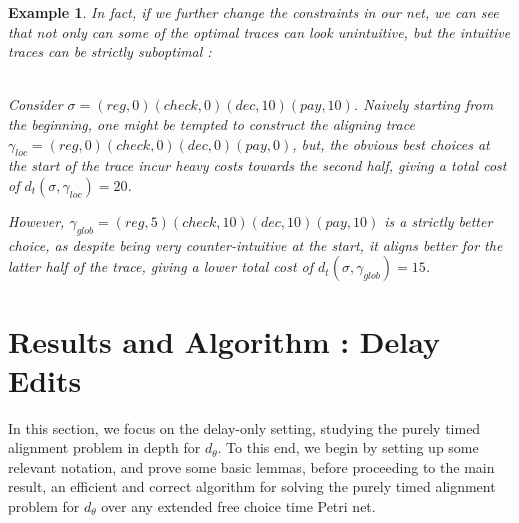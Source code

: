 \documentclass[conference]{IEEEtran}
\newtheorem{example}{Example}
\begin{document}
		\begin{example}\label{dthard}
		In fact, if we further change the constraints in our  net, we can see that not only can some of the optimal traces can look unintuitive, but the intuitive traces can be strictly suboptimal : 

			\\
			
			Consider $\sigma = (reg, 0)(check, 0)(dec, 10)(pay,10)$.
			Naively starting from the beginning, one might be tempted to construct the aligning trace $\gamma_{loc} = (reg, 0) (check, 0)(dec, 0)(pay, 0)$, but, the obvious best choices at the start of the trace incur heavy costs towards the second half, giving a total cost of $d_t(\sigma, \gamma_{loc}) = 20$. 
			
			However, $\gamma_{glob} = (reg, 5) (check, 10)(dec, 10)(pay, 10)$ is a strictly better choice, as despite being very counter-intuitive at the start, it aligns better for the latter half of the trace, giving a lower total cost of $d_t(\sigma, \gamma_{glob}) = 15$. 
			

		\end{example}
		


		\section{Results and Algorithm : Delay Edits}\label{4}
		In this section, we focus on the delay-only setting, studying the purely timed alignment problem in depth for $d_{\theta}$. 
		To this end, we begin by setting up some relevant notation, and prove some basic lemmas, before proceeding to the main result, an efficient and correct algorithm for solving the purely timed alignment problem for $d_{\theta}$ over any extended free choice time Petri net. 
\end{document}
